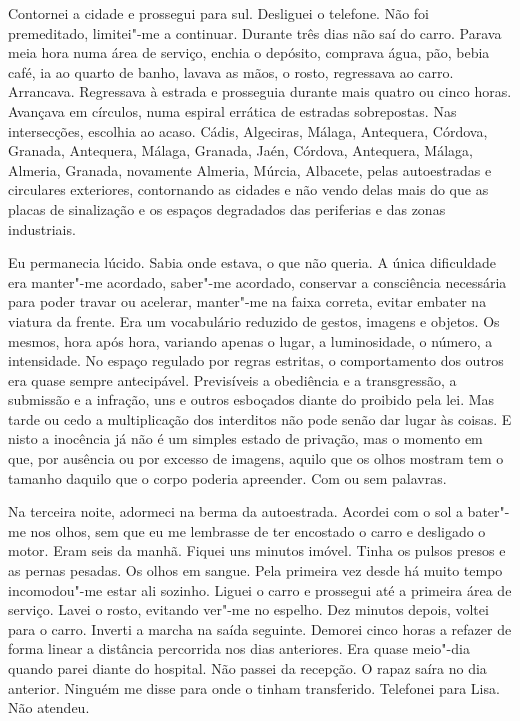 Contornei a cidade e prossegui para sul. Desliguei o telefone. Não foi
premeditado, limitei"-me a continuar. Durante três dias não saí do
carro. Parava meia hora numa área de serviço, enchia o depósito,
comprava água, pão, bebia café, ia ao quarto de banho, lavava as mãos, o
rosto, regressava ao carro. Arrancava. Regressava à estrada e prosseguia
durante mais quatro ou cinco horas. Avançava em círculos, numa espiral
errática de estradas sobrepostas. Nas intersecções, escolhia ao acaso.
Cádis, Algeciras, Málaga, Antequera, Córdova, Granada, Antequera,
Málaga, Granada, Jaén, Córdova, Antequera, Málaga, Almeria, Granada,
novamente Almeria, Múrcia, Albacete, pelas autoestradas e circulares
exteriores, contornando as cidades e não vendo delas mais do que as
placas de sinalização e os espaços degradados das periferias e das zonas
industriais.

Eu permanecia lúcido. Sabia onde estava, o que não queria. A única
dificuldade era manter"-me acordado, saber"-me acordado, conservar a
consciência necessária para poder travar ou acelerar, manter"-me na
faixa correta, evitar embater na viatura da frente. Era um vocabulário
reduzido de gestos, imagens e objetos. Os mesmos, hora após hora,
variando apenas o lugar, a luminosidade, o número, a intensidade. No
espaço regulado por regras estritas, o comportamento dos outros era
quase sempre antecipável. Previsíveis a obediência e a transgressão, a
submissão e a infração, uns e outros esboçados diante do proibido pela
lei. Mas tarde ou cedo a multiplicação dos interditos não pode senão dar
lugar às coisas. E nisto a inocência já não é um simples estado de
privação, mas o momento em que, por ausência ou por excesso de imagens,
aquilo que os olhos mostram tem o tamanho daquilo que o corpo poderia
apreender. Com ou sem palavras.

Na terceira noite, adormeci na berma da autoestrada. Acordei com o sol
a bater"-me nos olhos, sem que eu me lembrasse de ter encostado o carro
e desligado o motor. Eram seis da manhã. Fiquei uns minutos imóvel.
Tinha os pulsos presos e as pernas pesadas. Os olhos em sangue. Pela
primeira vez desde há muito tempo incomodou"-me estar ali sozinho.
Liguei o carro e prossegui até a primeira área de serviço. Lavei o
rosto, evitando ver"-me no espelho. Dez minutos depois, voltei para o
carro. Inverti a marcha na saída seguinte. Demorei cinco horas a refazer
de forma linear a distância percorrida nos dias anteriores. Era quase
meio"-dia quando parei diante do hospital. Não passei da recepção. O
rapaz saíra no dia anterior. Ninguém me disse para onde o tinham
transferido. Telefonei para Lisa. Não atendeu.

